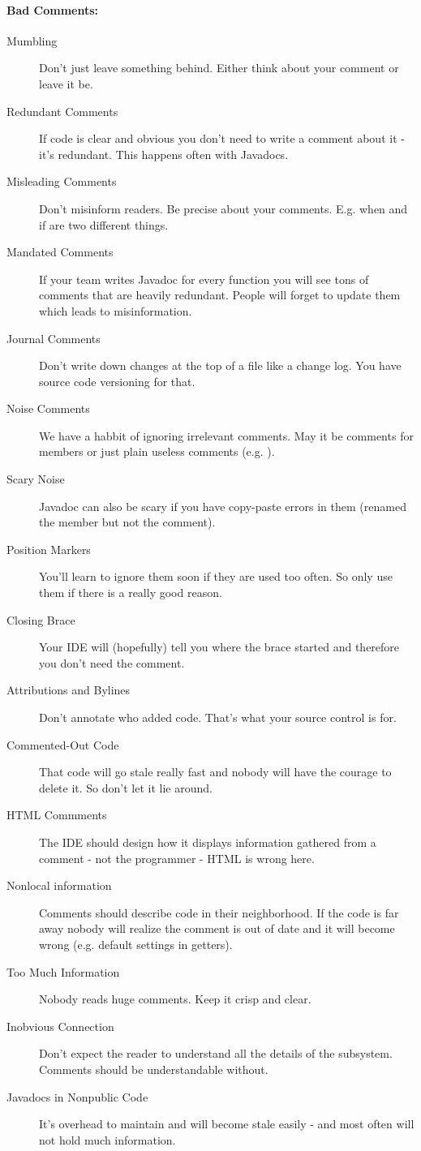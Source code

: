 \documentclass[a4paper, twocolumn]{article}
\newcommand{\code}[1]{\texttt{\color{black}{#1}}}
\begin{document}
\paragraph{Bad Comments:}
\begin{description}
	\item[Mumbling] Don't just leave something behind. Either think about your comment or leave it be.
	\item[Redundant Comments] If code is clear and obvious you don't need to write a comment about it - it's redundant. This happens often with Javadocs.
	\item[Misleading Comments] Don't misinform readers. Be precise about your comments. E.g. when and if are two different things.
	\item[Mandated Comments] If your team writes Javadoc for every function you will see tons of comments that are heavily redundant. People will forget to update them which leads to misinformation.
	\item[Journal Comments] Don't write down changes at the top of a file like a change log. You have source code versioning for that.
	\item[Noise Comments] We have a habbit of ignoring irrelevant comments. May it be comments for members or just plain useless comments (e.g. \code{// Give me a break!}).
	\item[Scary Noise] Javadoc can also be scary if you have copy-paste errors in them (renamed the member but not the comment).
	\item[Position Markers] You'll learn to ignore them soon if they are used too often. So only use them if there is a really good reason.
	\item[Closing Brace] Your IDE will (hopefully) tell you where the brace started and therefore you don't need the comment.
	\item[Attributions and Bylines] Don't annotate who added code. That's what your source control is for.
	\item[Commented-Out Code] That code will go stale really fast and nobody will have the courage to delete it. So don't let it lie around.
	\item[HTML Commments] The IDE should design how it displays information gathered from a comment - not the programmer - HTML is wrong here.
	\item[Nonlocal information] Comments should describe code in their neighborhood. If the code is far away nobody will realize the comment is out of date and it will become wrong (e.g. default settings in getters).
	\item[Too Much Information] Nobody reads huge comments. Keep it crisp and clear.
	\item[Inobvious Connection] Don't expect the reader to understand all the details of the subsystem. Comments should be understandable without.
	\item[Javadocs in Nonpublic Code] It's overhead to maintain and will become stale easily - and most often will not hold much information.
\end{description}
\end{document}
